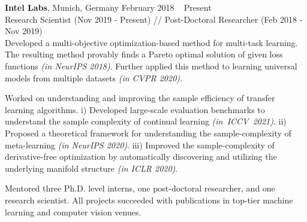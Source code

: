  \textbf{Intel Labs}, Munich, Germany \hfill February 2018 \textendash ~ Present \vspace{0.5mm}\\ \vspace{0mm}
   \hspace{-1.5mm} Research Scientist (Nov 2019 - Present) // Post-Doctoral Researcher (Feb 2018 - Nov 2019)  \hfill \vspace{-4mm} \\

Developed a multi-objective optimization-based method for multi-task learning. The resulting method provably finds a Pareto optimal solution of given loss functions \emph{(in NeurIPS 2018)}. Further applied this method to learning universal models from multiple datasets \emph{(in CVPR 2020)}.

Worked on understanding and improving the sample efficiency of transfer learning algorithms. i) Developed large-scale evaluation benchmarks to understand the sample complexity of continual learning \mbox{\emph{(in ICCV 2021)}}. ii) Proposed a theoretical framework for understanding the sample-complexity of meta-learning \emph{(in NeurIPS 2020)}. iii) Improved the sample-complexity of derivative-free optimization by automatically discovering and utilizing the underlying manifold structure \emph{(in ICLR 2020)}.

Mentored three Ph.D. level interns, one post-doctoral researcher, and one research scientist. All projects succeeded with publications in top-tier machine learning and computer vision venues.  
